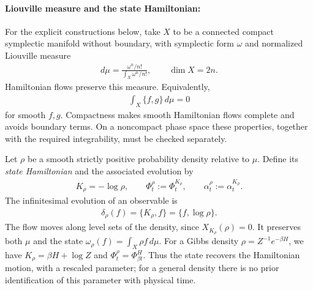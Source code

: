 \documentclass[a4paper,11pt]{article}
\theoremstyle{definition}
\begin{document}
\paragraph{Liouville measure and the state Hamiltonian:}
For the explicit constructions below, take $X$ to be a connected compact symplectic manifold without boundary, with symplectic form $\omega$ and normalized Liouville measure
\begin{align}
    d\mu=\frac{\omega^n/n!}{\int_X\omega^n/n!},\qquad \dim X=2n.
\end{align}
Hamiltonian flows preserve this measure. Equivalently,
\begin{align}\label{statepreserve}
    \int_X\{f,g\}\,d\mu=0
\end{align}
for smooth $f,g$. Compactness makes smooth Hamiltonian flows complete and avoids boundary terms. On a noncompact phase space these properties, together with the required integrability, must be checked separately.

Let $\rho$ be a smooth strictly positive probability density relative to $\mu$. Define its {\it state Hamiltonian} and the associated evolution by
\begin{align}\label{eq:classical-state-Hamiltonian}
    K_\rho=-\log\rho,\qquad
    \Phi_t^\rho:=\Phi_t^{K_\rho},\qquad
    \alpha_t^\rho:=\alpha_t^{K_\rho}.
\end{align}
The infinitesimal evolution of an observable is
\begin{align}\label{eq:classical-state-derivation}
    \delta_\rho(f)=\{K_\rho,f\}=\{f,\log\rho\}.
\end{align}
The flow moves along level sets of the density, since $X_{K_\rho}(\rho)=0$. It preserves both $\mu$ and the state $\omega_\rho(f)=\int_X\rho f\,d\mu$. For a Gibbs density $\rho=Z^{-1}e^{-\beta H}$, we have $K_\rho=\beta H+\log Z$ and $\Phi_t^\rho=\Phi_{\beta t}^H$. Thus the state recovers the Hamiltonian motion, with a rescaled parameter; for a general density there is no prior identification of this parameter with physical time.
\end{document}
